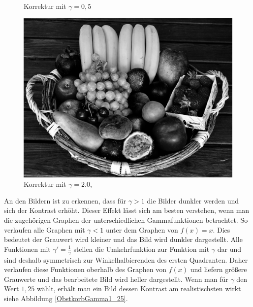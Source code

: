 \documentclass[course=erap]{aspdoc}
\begin{document}
\begin{figure}[h]
\begin{minipage}{0.49\linewidth}
			\caption{Korrektur mit $\gamma = 0,5$}
			\label{ObstkorbGamma0_5}
		\end{minipage}
		\centering
		\begin{minipage}{0.49\linewidth}
			\centering
			\includegraphics[scale=1.2]{Images/fruit_basket_gamma_2.png}
			\caption{Korrektur mit $\gamma = 2.0,$}
			\label{ObstkorbGamma2}
		\end{minipage}
	\end{figure}
	
	
	\noindent
	An den Bildern ist zu erkennen, dass für $\gamma > 1$ die Bilder dunkler werden und sich der Kontrast erhöht. Dieser Effekt lässt sich am besten verstehen, wenn man die zugehörigen Graphen der unterschiedlichen Gammafunktionen betrachtet. So verlaufen alle Graphen mit $\gamma < 1$  unter dem Graphen von $f(x)=x$. Dies bedeutet der Grauwert wird kleiner und das Bild wird dunkler dargestellt. Alle Funktionen mit $\gamma ' = \frac{1}{\gamma}$ stellen die Umkehrfunktion zur Funktion mit $\gamma$ dar und sind deshalb symmetrisch zur Winkelhalbierenden des ersten Quadranten. Daher verlaufen diese Funktionen oberhalb des Graphen von $f(x)$ und liefern größere Grauwerte und das bearbeitete Bild wird heller dargestellt. Wenn man für $\gamma$ den Wert $1,25$ wählt, erhält man ein Bild dessen Kontrast am realistischsten wirkt siehe Abbildung \ref{ObstkorbGamma1_25}.   
	
\end{document}
